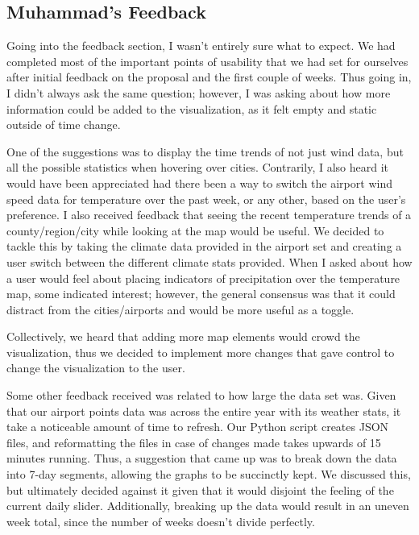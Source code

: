 \documentclass[10pt,twocolumn,twoside]{opticajnl}
\begin{document}
\subsection{Muhammad's Feedback}
Going into the feedback section, I wasn't entirely sure what to expect. We had completed most of the important points of usability that we had set for ourselves after initial feedback on the proposal and the first couple of weeks. Thus going in, I didn't always ask the same question; however, I was asking about how more information could be added to the visualization, as it felt empty and static outside of time change. 

One of the suggestions was to display the time trends of not just wind data, but all the possible statistics when hovering over cities. Contrarily, I also heard it would have been appreciated had there been a way to switch the airport wind speed data for temperature over the past week, or any other, based on the user's preference. I also received feedback that seeing the recent temperature trends of a county/region/city while looking at the map would be useful. We decided to tackle this by taking the climate data provided in the airport set and creating a user switch between the different climate stats provided. When I asked about how a user would feel about placing indicators of precipitation over the temperature map, some indicated interest; however, the general consensus was that it could distract from the cities/airports and would be more useful as a toggle.

Collectively, we heard that adding more map elements would crowd the visualization, thus we decided to implement more changes that gave control to change the visualization to the user.

Some other feedback received was related to how large the data set was. Given that our airport points data was across the entire year with its weather stats, it take a noticeable amount of time to refresh. Our Python script creates JSON files, and reformatting the files in case of changes made takes upwards of 15 minutes running. Thus, a suggestion that came up was to break down the data into 7-day segments, allowing the graphs to be succinctly kept. We discussed this, but ultimately decided against it given that it would disjoint the feeling of the current daily slider. Additionally, breaking up the data would result in an uneven week total, since the number of weeks doesn't divide perfectly.
\end{document}
